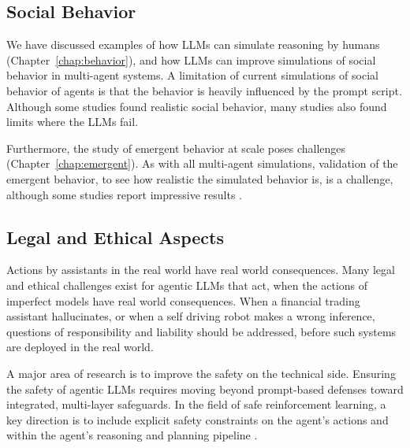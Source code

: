 \subsection{Social Behavior}
We have discussed examples of how LLMs can simulate reasoning by humans (Chapter~\ref{chap:behavior}), and how LLMs can improve simulations of social behavior in multi-agent systems. A limitation of current simulations of social behavior of agents is that the behavior is heavily influenced by the  prompt script.  Although some studies found realistic social behavior, many studies also found limits where the LLMs fail.  

Furthermore, the study of emergent behavior at scale poses challenges (Chapter~\ref{chap:emergent}). 
As with all multi-agent simulations, validation of the emergent behavior, to see how realistic  the simulated behavior is, is a challenge, although some studies report impressive results \citep{park2024generative}. %

\subsection{Legal and Ethical Aspects}
Actions by assistants in the real world have real world consequences. Many legal and ethical challenges exist for  agentic LLMs that act, when the actions of imperfect models have real world consequences. When a financial trading assistant hallucinates, or when a self driving robot makes a wrong inference, questions of responsibility and liability should be addressed, before such systems are deployed in the real world. 


A major area of research is to improve the safety on the technical side.
Ensuring the safety of agentic LLMs requires moving beyond prompt-based defenses toward integrated, multi-layer safeguards. In the field of safe reinforcement learning, a key direction is to include explicit safety constraints on the agent's actions and  within the agent's reasoning and planning pipeline \citep{gu2024review}. 

